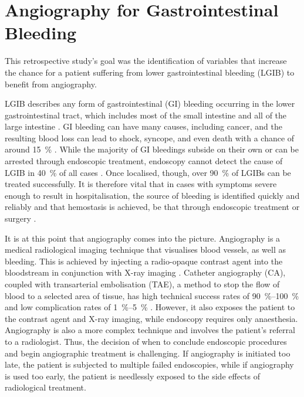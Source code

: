 
\chapter{Angiography for Gastrointestinal Bleeding}

This retrospective study's goal was the identification of variables that
increase the chance for a patient suffering from lower gastrointestinal
bleeding (LGIB) to benefit from angiography.

LGIB describes any form of gastrointestinal (GI) bleeding occurring in the
lower gastrointestinal tract, which includes most of the small intestine and
all of the large intestine \citep{Treuting2018}. GI bleeding can have many
causes, including cancer, and the resulting blood loss can lead to shock,
syncope, and even death with a chance of around \SI{15}{\percent} \citep{%
Rockey2005,PrasadKerlin2013,Wang2013,Kim2014}. While the majority of GI
bleedings subside on their own or can be arrested through endoscopic
treatment, endoscopy cannot detect the cause of LGIB in \SI{40}{\percent} of
all cases \citep{Yamada2015,Werner2018}. Once localised, though, over \SI{90}{%
\percent} of LGIBs can be treated successfully. It is therefore vital that
in cases with symptoms severe enough to result in hospitalisation, the source
of bleeding is identified quickly and reliably and that hemostasis is
achieved, be that through endoscopic treatment or surgery \citep{Strate2010,
Werner2018}.

It is at this point that angiography comes into the picture. Angiography is a
medical radiological imaging technique that visualises blood vessels, as well
as bleeding. This is achieved by injecting a radio-opaque contrast agent into
the bloodstream in conjunction with X-ray imaging \citep{Martin2015}. Catheter
angiography (CA), coupled with transarterial embolisation (TAE), a method to
stop the flow of blood to a selected area of tissue, has high technical
success rates of \SIrange{90}{100}{\percent} and low complication rates of
\SIrange{1}{5}{\percent} \citep{Tan2008,Evangelista2000,Strate2010,Kim2017,
Lee2018,Oakland2019,Pannatier2019}. However, it also exposes the patient to
the  contrast agent and X-ray imaging, while endoscopy requires only
anaesthesia. Angiography is also a more complex technique and involves the
patient's referral to a radiologist. Thus, the decision of when to conclude
endoscopic procedures and begin angiographic treatment is challenging. If
angiography is initiated too late, the patient is subjected to multiple
failed endoscopies, while if angiography is used too early, the patient is
needlessly exposed to the side effects of radiological treatment.

